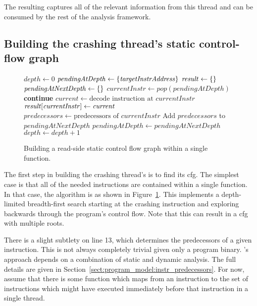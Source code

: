 The resulting {\StateMachine} captures all of the relevant information
from this thread and can be consumed by the rest of the analysis
framework.

\subsection{Building the crashing thread's static control-flow graph}
\label{sect:derive:build_static_cfg}

\begin{figure}
\begin{algorithmic}[1]
\State $\mathit{depth} \gets 0$
\State $\mathit{pendingAtDepth} \gets \{\mathit{targetInstrAddress}\}$
\State $\mathit{result} \gets \{\}$
  \State $\mathit{pendingAtNextDepth} \gets \{\}$
    \State $\mathit{currentInstr} \gets \mathit{pop}(\mathit{pendingAtDepth})$
      \State \textbf{continue}
    \EndIf
    \State $\mathit{current} \gets \text{decode instruction at } \mathit{currentInstr}$
    \State $\mathit{result}[\mathit{currentInstr}] \gets \mathit{current}$
    \State $\mathit{predecessors} \gets \text{predecessors of } \mathit{currentInstr}$
    \State Add $\mathit{predecessors}$ to $\mathit{pendingAtNextDepth}$
  \EndWhile
  \State $\mathit{pendingAtDepth} \gets \mathit{pendingAtNextDepth}$
  \State $\mathit{depth} \gets \mathit{depth} + 1$
\EndWhile
\end{algorithmic}
\caption{Building a read-side static control flow graph within a
  single function.}
\label{fig:derive:static_read_cfg_single_function}
\end{figure}

The first step in building the crashing thread's {\StateMachine} is to
find its \gls{cfg}.  The simplest case is that all of the needed
instructions are contained within a single function.  In that case,
the algorithm is as shown in
Figure~\ref{fig:derive:static_read_cfg_single_function}.  This
implements a depth-limited breadth-first search starting at the
crashing instruction and exploring backwards through the program's
control flow.  Note that this can result in a \gls{cfg} with multiple roots.

There is a slight subtlety on line 13, which determines the
predecessors of a given instruction.  This is not always completely
trivial given only a program binary.  {\Technique}'s approach depends
on a combination of static and dynamic analysis.  The full details are
given in Section~\ref{sect:program_model:instr_predecessors}.  For
now, assume that there is some function which maps from an instruction
to the set of instructions which might have executed immediately
before that instruction in a single thread.


